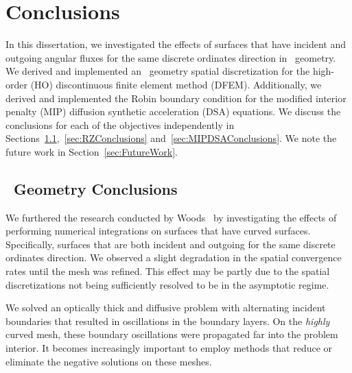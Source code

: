 \documentclass[12pt]{article}
\begin{document}
\section{Conclusions}
\label{sec:Conclusions}

In this dissertation, we investigated the effects of surfaces that have incident and outgoing angular fluxes for the same discrete ordinates direction in \XY\ geometry. We derived and implemented an \RZ\ geometry spatial discretization for the high-order (HO) discontinuous finite element method (DFEM). Additionally, we derived and implemented the Robin boundary condition for the modified interior penalty (MIP) diffusion synthetic acceleration (DSA) equations. We discuss the conclusions for each of the objectives independently in Sections~\ref{sec:XYConclusions},~\ref{sec:RZConclusions} and~\ref{sec:MIPDSAConclusions}. We note the future work in Section~\ref{sec:FutureWork}.

\subsection{\XY\ Geometry Conclusions}
\label{sec:XYConclusions}
We furthered the research conducted by Woods~\cite{WoodsThesis} by investigating the effects of performing numerical integrations on surfaces that have curved surfaces. Specifically, surfaces that are both incident and outgoing for the same discrete ordinates direction. We observed a slight degradation in the spatial convergence rates until the mesh was refined. This effect may be partly due to the spatial discretizations not being sufficiently resolved to be in the asymptotic regime.

We solved an optically thick and diffusive problem with alternating incident boundaries that resulted in oscillations in the boundary layers. On the \emph{highly} curved mesh, these boundary oscillations were propagated far into the problem interior. It becomes increasingly important to employ methods that reduce or eliminate the negative solutions on these meshes. 

\end{document}
